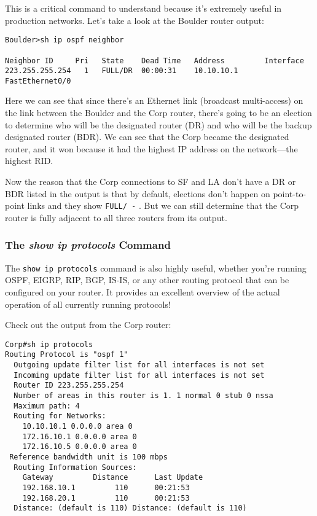 This is a critical command to understand because it's extremely useful
in production networks. Let's take a look at the Boulder router output:

\begin{verbatim}
Boulder>sh ip ospf neighbor
 
Neighbor ID     Pri   State    Dead Time   Address         Interface
223.255.255.254   1   FULL/DR  00:00:31    10.10.10.1      FastEthernet0/0
\end{verbatim}

Here we can see that since there's an Ethernet link (broadcast
multi-access) on the link between the Boulder and the Corp router,
there's going to be an election to determine who will be the designated
router (DR) and who will be the backup designated router (BDR). We can
see that the Corp became the designated router, and it won because it
had the highest IP address on the network---the highest RID.

Now the reason that the Corp connections to SF and LA don't have a DR or
BDR listed in the output is that by default, elections don't happen on
point-to-point links and they show \texttt{FULL/\ -} . But we can still
determine that the Corp router is fully adjacent to all three routers
from its output.

\subsubsection[The \emph{show ip protocols}
Command]{\texorpdfstring{\protect\hypertarget{c18.xhtmlux5cux23c18-sec-16}{}{}The
\emph{show ip protocols} Command}{The show ip protocols Command}}

The \texttt{show\ ip\ protocols} command is also highly useful, whether
you're running OSPF, EIGRP, RIP, BGP, IS-IS, or any other routing
protocol that can be configured on your router. It provides an excellent
overview of the actual operation of all currently running protocols!

Check out the output from the Corp router:

\begin{verbatim}
Corp#sh ip protocols
Routing Protocol is "ospf 1"
  Outgoing update filter list for all interfaces is not set
  Incoming update filter list for all interfaces is not set
  Router ID 223.255.255.254
  Number of areas in this router is 1. 1 normal 0 stub 0 nssa
  Maximum path: 4
  Routing for Networks:
    10.10.10.1 0.0.0.0 area 0
    172.16.10.1 0.0.0.0 area 0
    172.16.10.5 0.0.0.0 area 0
 Reference bandwidth unit is 100 mbps
  Routing Information Sources:
    Gateway         Distance      Last Update
    192.168.10.1         110      00:21:53
    192.168.20.1         110      00:21:53
  Distance: (default is 110) Distance: (default is 110)
\end{verbatim}


